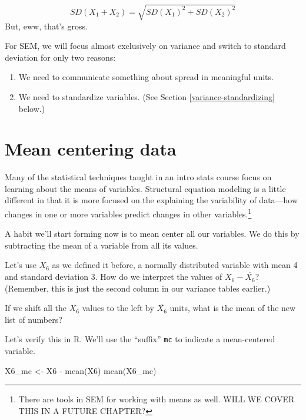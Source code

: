 \documentclass[
]{book}
\newenvironment{Shaded}{\begin{snugshade}}{\end{snugshade}}
\newcommand{\FunctionTok}[1]{\textcolor[rgb]{0.00,0.00,0.00}{#1}}
\newcommand{\NormalTok}[1]{#1}
\newcommand{\OtherTok}[1]{\textcolor[rgb]{0.56,0.35,0.01}{#1}}
\newcommand{\SpecialCharTok}[1]{\textcolor[rgb]{0.00,0.00,0.00}{#1}}
\providecommand{\tightlist}{%
  \setlength{\itemsep}{0pt}\setlength{\parskip}{0pt}}
\begin{document}
\[
SD\left(X_{1} + X_{2}\right) = \sqrt{
SD\left(X_{1}\right)^{2} + SD\left(X_{2}\right)^{2}
}
\]
But, eww, that's gross.

For SEM, we will focus almost exclusively on variance and switch to standard deviation for only two reasons:

\begin{enumerate}
\def\labelenumi{\arabic{enumi}.}
\tightlist
\item
  We need to communicate something about spread in meaningful units.
\item
  We need to standardize variables. (See Section \ref{variance-standardizing} below.)
\end{enumerate}

\hypertarget{variance-mean-centering}{%
\section{Mean centering data}\label{variance-mean-centering}}

Many of the statistical techniques taught in an intro stats course focus on learning about the means of variables. Structural equation modeling is a little different in that it is more focused on the explaining the variability of data---how changes in one or more variables predict changes in other variables.\footnote{There are tools in SEM for working with means as well. WILL WE COVER THIS IN A FUTURE CHAPTER?}

A habit we'll start forming now is to mean center all our variables. We do this by subtracting the mean of a variable from all its values.

Let's use \(X_{6}\) as we defined it before, a normally distributed variable with mean 4 and standard deviation 3. How do we interpret the values of \(X_{6} - \overline{X_{6}}\)? (Remember, this is just the second column in our variance tables earlier.)

If we shift all the \(X_{6}\) values to the left by \(\overline{X_{6}}\) units, what is the mean of the new list of numbers?

Let's verify this in R. We'll use the ``suffix'' \texttt{mc} to indicate a mean-centered variable.

\begin{Shaded}
\begin{Highlighting}[]
\NormalTok{X6\_mc }\OtherTok{\textless{}{-}}\NormalTok{ X6 }\SpecialCharTok{{-}} \FunctionTok{mean}\NormalTok{(X6)}
\FunctionTok{mean}\NormalTok{(X6\_mc)}
\end{Highlighting}
\end{Shaded}
\end{document}
